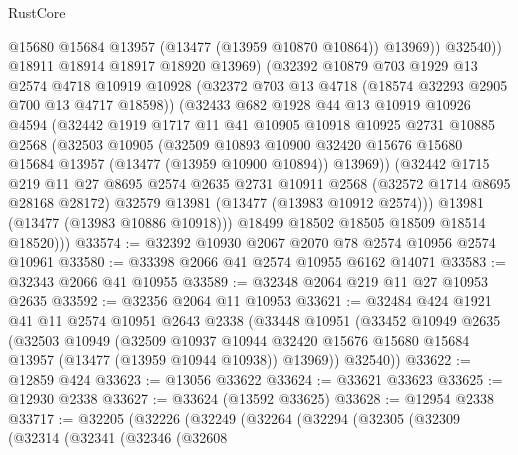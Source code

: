 \begin{lexlean}{RustCore}
\begin{coremodule}
                @15680
                @15684
                @13957
                (@13477 (@13959 @10870 @10864))
                @13969))
            @32540))
        @18911
        @18914
        @18917
        @18920
        @13969)
      (@32392
        @10879
        @703
        @1929
        @13
        @2574
        @4718
        @10919
        @10928
        (@32372 @703 @13 @4718 (@18574 @32293 @2905 @700 @13 @4717 @18598))
        (@32433
          @682
          @1928
          @44
          @13
          @10919
          @10926
          @4594
          (@32442
            @1919
            @1717
            @11
            @41
            @10905
            @10918
            @10925
            @2731
            @10885
            @2568
            (@32503
              @10905
              (@32509
                @10893
                @10900
                @32420
                @15676
                @15680
                @15684
                @13957
                (@13477 (@13959 @10900 @10894))
                @13969))
            (@32442
              @1715
              @219
              @11
              @27
              @8695
              @2574
              @2635
              @2731
              @10911
              @2568
              (@32572 @1714 @8695 @28168 @28172)
              @32579
              @13981
              (@13477 (@13983 @10912 @2574)))
            @13981
            (@13477 (@13983 @10886 @10918)))
          @18499
          @18502
          @18505
          @18509
          @18514
          @18520)))
@33574 := @32392 @10930 @2067 @2070 @78 @2574 @10956 @2574 @10961
@33580 := @33398 @2066 @41 @2574 @10955 @6162 @14071
@33583 := @32343 @2066 @41 @10955
@33589 := @32348 @2064 @219 @11 @27 @10953 @2635
@33592 := @32356 @2064 @11 @10953
@33621 := @32484
    @424
    @1921
    @41
    @11
    @2574
    @10951
    @2643
    @2338
    (@33448
      @10951
      (@33452
        @10949
        @2635
        (@32503
          @10949
          (@32509
            @10937
            @10944
            @32420
            @15676
            @15680
            @15684
            @13957
            (@13477 (@13959 @10944 @10938))
            @13969))
        @32540))
@33622 := @12859 @424
@33623 := @13056 @33622
@33624 := @33621 @33623
@33625 := @12930 @2338
@33627 := @33624 (@13592 @33625)
@33628 := @12954 @2338
@33717 := @32205
    (@32226
      (@32249
        (@32264
          (@32294
            (@32305
              (@32309
                (@32314
                  (@32341
                    (@32346
                      (@32608

\end{coremodule}
\end{lexlean}
